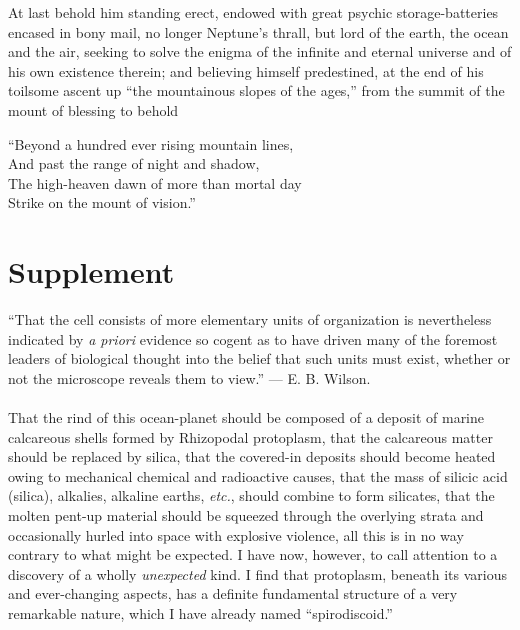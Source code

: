 \documentclass[a4paper, 12pt, oneside]{article}
\begin{document}
At last behold him standing erect, endowed with great psychic storage-batteries encased in bony mail, no longer Neptune's thrall, but lord of the earth, the ocean and the air, seeking to solve the enigma of the infinite and eternal universe and of his own existence therein; and believing himself predestined, at the end of his toilsome ascent up ``the mountainous slopes of the ages,'' from the summit of the mount of blessing to behold
\begin{displayquote}
``Beyond a hundred ever rising mountain lines,\\And past the range of night and shadow,\\The high-heaven dawn of more than mortal day\\Strike on the mount of vision.''
\end{displayquote}
\clearpage
\section{Supplement}
\begin{displayquote}
``That the cell consists of more elementary units of organization is nevertheless indicated by \emph{a priori} evidence so cogent as to have driven many of the foremost leaders of biological thought into the belief that such units must exist, whether or not the microscope reveals them to view.'' --- E. B. Wilson.
\end{displayquote}
\paragraph{}
That the rind of this ocean-planet should be composed of a deposit of marine calcareous shells formed by Rhizopodal protoplasm, that the calcareous matter should be replaced by silica, that the covered-in deposits should become heated owing to mechanical chemical and radioactive causes, that the mass of silicic acid (silica), alkalies, alkaline earths, \emph{etc.}, should combine to form silicates, that the molten pent-up material should be squeezed through the overlying strata and occasionally hurled into space with explosive violence, all this is in no way contrary to what might be expected. I have now, however, to call attention to a discovery of a wholly \emph{unexpected} kind. I find that protoplasm, beneath its various and ever-changing aspects, has a definite fundamental structure of a very remarkable nature, which I have already named ``spirodiscoid.''
\end{document}
